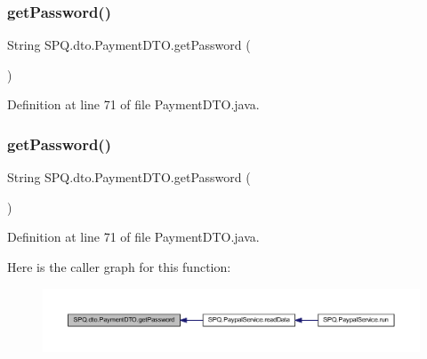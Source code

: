 \subsubsection{\texorpdfstring{get\+Password()}{getPassword()}\hspace{0.1cm}{\footnotesize\ttfamily [1/3]}}
{\footnotesize\ttfamily String S\+P\+Q.\+dto.\+Payment\+D\+T\+O.\+get\+Password (\begin{DoxyParamCaption}{ }\end{DoxyParamCaption})}



Definition at line 71 of file Payment\+D\+T\+O.\+java.

\mbox{\label{class_s_p_q_1_1dto_1_1_payment_d_t_o_ae012449dd0baea7f169bb64dcf973dec}} 
\subsubsection{\texorpdfstring{get\+Password()}{getPassword()}\hspace{0.1cm}{\footnotesize\ttfamily [2/3]}}
{\footnotesize\ttfamily String S\+P\+Q.\+dto.\+Payment\+D\+T\+O.\+get\+Password (\begin{DoxyParamCaption}{ }\end{DoxyParamCaption})}



Definition at line 71 of file Payment\+D\+T\+O.\+java.

Here is the caller graph for this function\+:
\nopagebreak
\begin{figure}[H]
\begin{center}
\leavevmode
\includegraphics[width=350pt]{class_s_p_q_1_1dto_1_1_payment_d_t_o_ae012449dd0baea7f169bb64dcf973dec_icgraph}
\end{center}
\end{figure}
\mbox{\label{class_s_p_q_1_1dto_1_1_payment_d_t_o_ae012449dd0baea7f169bb64dcf973dec}} 

